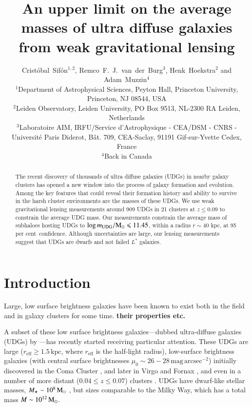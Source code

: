 \documentclass[usenatbib,fleqn]{mnras}
\title[Weak lensing masses of UDGs]{An upper limit on the average masses of ultra diffuse galaxies from weak gravitational lensing}
\author[C.\ Sif\'on, R.\ F.\ J.\ van der Burg, H.\ Hoekstra \& A.\ Muzzin]
  {
      Crist\'obal~Sif\'on$^{1,2}$, %
      Remco~F.~J.~van~der~Burg$^3$,
      Henk~Hoekstra$^2$
      and
      Adam~Muzzin$^4$%
\\
      $^1$Department of Astrophysical Sciences, Peyton Hall, Princeton University, Princeton, NJ 08544, USA\\
      $^2$Leiden Observatory, Leiden University, PO Box 9513, NL-2300 RA Leiden, Netherlands\\
      $^3$Laboratoire AIM, IRFU/Service d'Astrophysique - CEA/DSM - CNRS - Universit\'e Paris Diderot, B\^at. 709, CEA-Saclay, 91191 Gif-sur-Yvette Cedex, France\\
      $^4$Back in Canada
  }
\def\percent{ per cent}
\def\reff{r_\mathrm{eff}}
\begin{document}
\label{firstpage}
\pagerange{\pageref{firstpage}--\pageref{lastpage}}

\maketitle

\begin{abstract}
        The recent discovery of thousands of ultra diffuse galaxies (UDGs) in nearby galaxy clusters has opened a new window into the process of galaxy formation and evolution. Among the key features that could reveal their formation history and ability to survive in the harsh cluster environments are the masses of these UDGs. We use weak gravitational lensing measurements around 909 UDGs in 21 clusters at $z\leq0.09$ to constrain the average UDG mass. Our measurements constrain the average mass of subhaloes hosting UDGs to $\log m_{\rm UDG}/\mathrm{M}_\odot\leqslant11.45$, within a radius $r\sim40$ kpc, at 95\percent\ confidence. Although uncertainties are large, our lensing measurements suggest that UDGs are dwarfs and not failed $L^*$ galaxies.
\end{abstract}

\section{Introduction}
\label{s:intro}

Large, low surface brightness galaxies have been known to exist both in the field \citep{} and in galaxy clusters \citep{} for some time. \textbf{their properties etc.}

A subset of these low surface brightness galaxies---dubbed ultra-diffuse galaxies (UDGs) by \cite{vandokkum15}---has recently started receiving particular attention. These UDGs are large ($\reff\geq1.5\,\mathrm{kpc}$, where $\reff$ is the half-light radius), low-surface brightness galaxies (with central surface brightnesses $\mu_0\sim26-28\,\mathrm{mag\,arcsec^{-2}}$) initially discovered in the Coma Cluster \citep{vandokkum15,koda15,yagi16}, and later in Virgo \citep{mihos15} and Fornax \citep{munoz15}, and even in a number of more distant ($0.04\leq z \leq0.07$) clusters \citep{vdburg16}. %
UDGs have dwarf-like stellar masses, $M_\star\sim10^8\,\mathrm{M}_\odot$ \citep[e.g.,][]{vdburg16}, but sizes comparable to the Milky Way, which has a total mass $M\sim10^{12}\,\mathrm{M}_\odot$.
\end{document}
